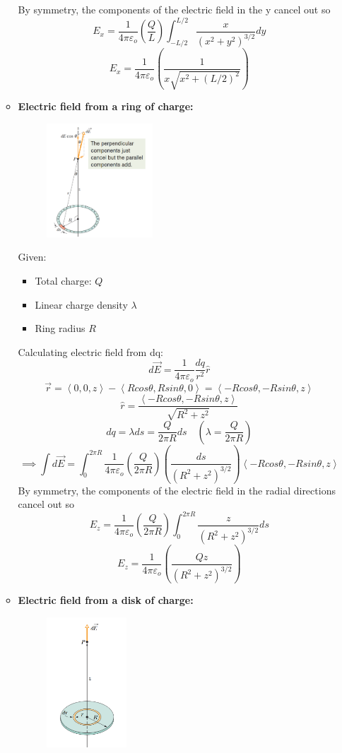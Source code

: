 \documentclass[12pt]{article}
\begin{document}
\begin{enumerate}
\begin{itemize}
By symmetry, the components of the electric field in the y cancel out so
\[E_x=\frac{1}{4\pi\varepsilon_o}\left(\frac{Q}{L}\right)\int_{-L/2}^{L/2}\frac{x}{(x^2+y^2)^{3/2}}dy\]
\[\boxed{E_x = \frac{1}{4\pi\varepsilon_o} \left( \frac{1}{x\sqrt{x^2+(L/2)^2}} \right)}\]
        \item \textbf{Electric field from a ring of charge:} 
        \begin{figure}[H]
            \centering
            \includegraphics[width=0.4\textwidth]{ring.png}
        \end{figure}
        Given:
        \begin{itemize}
            \item Total charge: $Q$
            \item Linear charge density $\lambda$
            \item Ring radius $R$
        \end{itemize}
Calculating electric field from dq:
\[d\vec{E}=\frac{1}{4\pi\varepsilon_o}\frac{dq}{r^2}\hat{r}\]
\[\vec{r}=\left<0,0,z\right>-\left<Rcos\theta,Rsin\theta,0\right>=\left<-Rcos\theta,-Rsin\theta,z\right>\]
\[\hat{r}=\frac{\left<-Rcos\theta,-Rsin\theta,z\right>}{\sqrt{R^2+z^2}}\]
\[dq=\lambda ds=\frac{Q}{2\pi R}ds \quad \left(\lambda=\frac{Q}{2\pi R}\right)\]
\[\implies \int d\vec{E}=\int_{0}^{2\pi R}\frac{1}{4\pi\varepsilon_o}\left(\frac{Q}{2\pi R}\right)\left(\frac{ds}{(R^2+z^2)^{3/2}}\right)\left<-Rcos\theta,-Rsin\theta,z\right>\]
By symmetry, the components of the electric field in the radial directions cancel out so
\[E_z=\frac{1}{4\pi\varepsilon_o}\left(\frac{Q}{2\pi R}\right)\int_{0}^{2\pi R}\frac{z}{(R^2+z^2)^{3/2}}ds\]
\[\boxed{E_z = \frac{1}{4\pi\varepsilon_o} \left( \frac{Qz}{(R^2+z^2)^{3/2}} \right)}\]
        \item \textbf{Electric field from a disk of charge:}
        \begin{figure}[H]
            \centering
            \includegraphics[width=0.3\textwidth]{disk.png}

\end{figure}
\end{itemize}
\end{enumerate}
\end{document}
